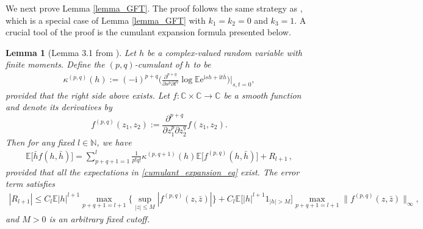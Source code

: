 \documentclass[10pt,reqno]{amsart}
\numberwithin{equation}{section}
\numberwithin{figure}{section}
\theoremstyle{plain}
\newtheorem{lemma}[theorem]{Lemma}
\newcommand{\N}{{\mathbb{N}}}
\newcommand{\C}{{\mathbb{C}}}
\newcommand{\ii}{\mathrm{i}}
\newcommand{\<}{\langle}
\renewcommand{\>}{\rangle}
\newcommand{\E}{\mathbb{E}}
\begin{document}
We next prove  Lemma \ref{lemma_GFT}. The proof follows the same strategy as \cite[Lemma 4.3]{chafai-garcia-zelada-xu}, which is a special case of Lemma \ref{lemma_GFT} with $k_1=k_2=0$ and $k_3=1$.  A crucial tool of the proof is the cumulant expansion formula presented below.
\begin{lemma}[Lemma 3.1 from \cite{zbMATH06775355}]\label{cumulant_expansion_lemma}
		Let $h$ be a complex-valued random variable with finite moments. Define the $(p,q)$-cumulant of $h$ to be 
   \begin{align}\label{cumulant_pq}
	\kappa^{(p,q)}(h):=(-\ii)^{p+q} \Big( \frac{\partial^{p+q}}{\partial s^p
     \partial t^q} \log \E \mathrm{e}^{\mathrm {i} s h+\mathrm{i} t \overline{h}} \Big) \Big|_{s,t=0},
    \end{align}
    provided that the right side above exists.
    Let $f: \C \times \C \longrightarrow \C$ be a smooth function and denote its derivatives by
	$$f^{(p,q)}(z_1,z_2):=\frac{\partial^{p+q}}{\partial z^p_1 \partial z^q_2} f(z_1,z_2).$$ 
	Then for any fixed $l \in \N$, we have
	\begin{align}\label{cumulant_expansion_eq}
	\E\big[ \bar{h} f(h, \bar{h})\big]=\sum_{p+q+1=1}^l \frac{1}{p!q!} \kappa^{(p,q+1)}(h)\E\big[ f^{(p,q)}(h,\bar h)\big] +R_{l+1}\,,
	\end{align}
	provided that all the expectations in \eqref{cumulant_expansion_eq} exist. The error term satisfies
	\begin{align}\label{cumulant_error}
	|R_{l+1}| \leq C_l \E |h|^{l+1} \max_{p+q+1=l+1} \Big\{ \sup_{|z| \leq M} |f^{(p,q)}(z,\bar{z})| \Big\}+C_l \E \Big[ |h|^{l+1} 1_{|h|>M}\Big] \max_{p+q+1=l+1} \|f^{(p,q)}(z,\bar{z})\|_{\infty},
	\end{align}
	and $M>0$ is an arbitrary fixed cutoff.
\end{lemma}
\end{document}
